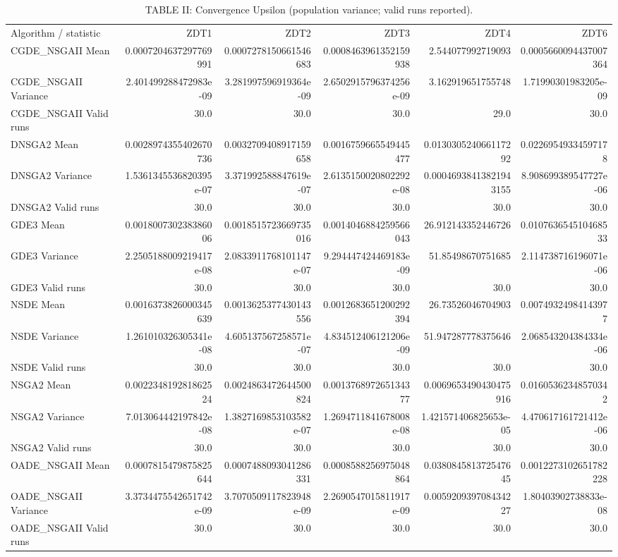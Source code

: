 \begin{table}[t]
\centering
\caption{TABLE II: Convergence Upsilon (population variance; valid runs reported).}
\begin{tabular}{lrrrrr}
\hline
Algorithm / statistic & ZDT1 & ZDT2 & ZDT3 & ZDT4 & ZDT6 \\
CGDE\_NSGAII Mean & 0.0007204637297769991 & 0.0007278150661546683 & 0.0008463961352159938 & 2.544077992719093 & 0.0005660094437007364 \\
CGDE\_NSGAII Variance & 2.401499288472983e-09 & 3.281997596919364e-09 & 2.6502915796374256e-09 & 3.162919651755748 & 1.71990301983205e-09 \\
CGDE\_NSGAII Valid runs & 30.0 & 30.0 & 30.0 & 29.0 & 30.0 \\
DNSGA2 Mean & 0.0028974355402670736 & 0.0032709408917159658 & 0.0016759665549445477 & 0.013030524066117292 & 0.02269549334597178 \\
DNSGA2 Variance & 1.5361345536820395e-07 & 3.371992588847619e-07 & 2.6135150020802292e-08 & 0.00046938413821943155 & 8.908699389547727e-06 \\
DNSGA2 Valid runs & 30.0 & 30.0 & 30.0 & 30.0 & 30.0 \\
GDE3 Mean & 0.001800730238386006 & 0.0018515723669735016 & 0.0014046884259566043 & 26.912143352446726 & 0.010763654510468533 \\
GDE3 Variance & 2.2505188009219417e-08 & 2.0833911768101147e-07 & 9.294447424469183e-09 & 51.85498670751685 & 2.114738716196071e-06 \\
GDE3 Valid runs & 30.0 & 30.0 & 30.0 & 30.0 & 30.0 \\
NSDE Mean & 0.0016373826000345639 & 0.0013625377430143556 & 0.0012683651200292394 & 26.73526046704903 & 0.00749324984143977 \\
NSDE Variance & 1.261010326305341e-08 & 4.605137567258571e-07 & 4.834512406121206e-09 & 51.947287778375646 & 2.068543204384334e-06 \\
NSDE Valid runs & 30.0 & 30.0 & 30.0 & 30.0 & 30.0 \\
NSGA2 Mean & 0.002234819281862524 & 0.0024863472644500824 & 0.001376897265134377 & 0.0069653490430475916 & 0.01605362348570342 \\
NSGA2 Variance & 7.013064442197842e-08 & 1.3827169853103582e-07 & 1.2694711841678008e-08 & 1.421571406825653e-05 & 4.470617161721412e-06 \\
NSGA2 Valid runs & 30.0 & 30.0 & 30.0 & 30.0 & 30.0 \\
OADE\_NSGAII Mean & 0.0007815479875825644 & 0.0007488093041286331 & 0.0008588256975048864 & 0.038084581372547645 & 0.0012273102651782228 \\
OADE\_NSGAII Variance & 3.3734475542651742e-09 & 3.7070509117823948e-09 & 2.2690547015811917e-09 & 0.005920939708434227 & 1.80403902738833e-08 \\
OADE\_NSGAII Valid runs & 30.0 & 30.0 & 30.0 & 30.0 & 30.0 \\
\hline
\end{tabular}
\end{table}
